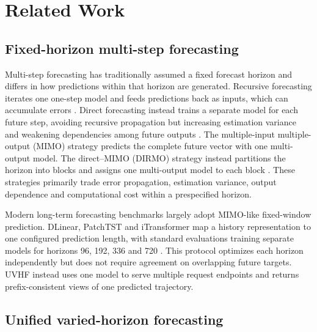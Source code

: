 \section{Related Work}
\label{sec:related-work}


\subsection{Fixed-horizon multi-step forecasting}


Multi-step forecasting has traditionally assumed a fixed forecast horizon and differs in how predictions within that horizon are generated. Recursive forecasting iterates one one-step model and feeds predictions back as inputs, which can accumulate errors \citep{taieb2014boosting}. Direct forecasting instead trains a separate model for each future step, avoiding recursive propagation but increasing estimation variance and weakening dependencies among future outputs \citep{taieb2014boosting}. The multiple-input multiple-output (MIMO) strategy predicts the complete future vector with one multi-output model. The direct--MIMO (DIRMO) strategy instead partitions the horizon into blocks and assigns one multi-output model to each block \citep{bontempi2008mimo,taieb2012review,green2025stratify}. These strategies primarily trade error propagation, estimation variance, output dependence and computational cost within a prespecified horizon.

Modern long-term forecasting benchmarks largely adopt MIMO-like fixed-window prediction. DLinear, PatchTST and iTransformer map a history representation to one configured prediction length, with standard evaluations training separate models for horizons 96, 192, 336 and 720 \citep{zeng2023dlinear,nie2023patchtst,liu2024itransformer}. This protocol optimizes each horizon independently but does not require agreement on overlapping future targets. UVHF instead uses one model to serve multiple request endpoints and returns prefix-consistent views of one predicted trajectory.

\subsection{Unified varied-horizon forecasting}


